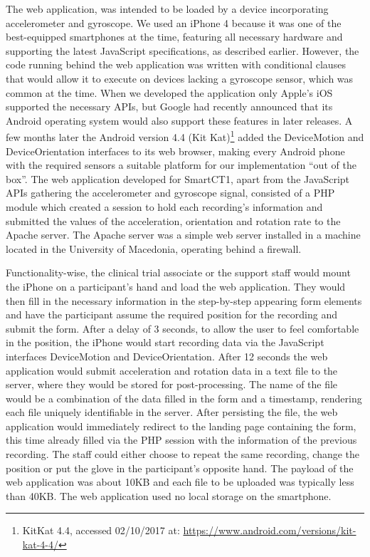 The web application, was intended to be loaded by a device incorporating accelerometer and gyroscope. We used an iPhone 4 because it was one of the best-equipped smartphones at the time, featuring all necessary hardware and supporting the latest JavaScript specifications, as described earlier. However, the code running behind the web application was written with conditional clauses that would allow it to execute on devices lacking a gyroscope sensor, which was common at the time. When we developed the application only Apple's iOS supported the necessary \gls{API}s, but Google had recently announced that its Android operating system would also support these features in later releases. A few months later the Android version 4.4 (Kit Kat)\footnote{KitKat 4.4, accessed 02/10/2017 at: \url{https://www.android.com/versions/kit-kat-4-4/}} added the DeviceMotion and DeviceOrientation interfaces to its web browser, making every Android phone with the required sensors a suitable platform for our implementation “out of the box”. The web application developed for \gls{SmartCT1}, apart from the JavaScript \gls{API}s gathering the accelerometer and gyroscope signal, consisted of a PHP module which created a session to hold each recording's information and submitted the values of the acceleration, orientation and rotation rate to the Apache server. The Apache server was a simple web server installed in a machine located in the University of Macedonia, operating behind a firewall. 

Functionality-wise, the clinical trial associate or the support staff would mount the iPhone on a participant's hand and load the web application. They would then fill in the necessary information in the step-by-step appearing form elements and have the participant assume the required position for the recording and submit the form. After a delay of 3 seconds, to allow the user to feel comfortable in the position, the iPhone would start recording data via the JavaScript interfaces DeviceMotion and DeviceOrientation. After 12 seconds the web application would submit acceleration and rotation data in a text file to the server, where they would be stored for post-processing. The name of the file would be a combination of the data filled in the form and a timestamp, rendering each file uniquely identifiable in the server. After persisting the file, the web application would immediately redirect to the landing page containing the form, this time already filled via the PHP session with the information of the previous recording. The staff could either choose to repeat the same recording, change the position or put the glove in the participant's opposite hand. The payload of the web application was about 10KB and each file to be uploaded was typically less than 40KB. The web application used no local storage on the smartphone. 

